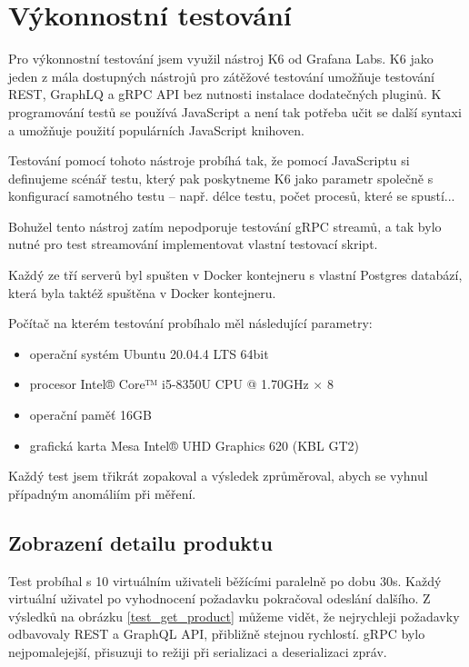 \documentclass[thesis=M,czech]{FITthesis}[2019/12/23]
\begin{document}
\chapter{Výkonnostní testování}
Pro výkonnostní testování jsem využil nástroj K6 od Grafana Labs. K6 jako jeden z mála dostupných nástrojů pro zátěžové testování umožňuje testování REST, GraphLQ a gRPC API bez nutnosti instalace dodatečných pluginů. K programování testů se používá JavaScript a není tak potřeba učit se další syntaxi a umožňuje použití populárních JavaScript knihoven.

Testování pomocí tohoto nástroje probíhá tak, že pomocí JavaScriptu si definujeme scénář testu, který pak poskytneme K6 jako parametr společně s konfigurací samotného testu -- např. délce testu, počet procesů, které se spustí...

Bohužel tento nástroj zatím nepodporuje testování gRPC streamů, a tak bylo nutné pro test streamování implementovat vlastní testovací skript.

Každý ze tří serverů byl spušten v Docker kontejneru s vlastní Postgres databází, která byla taktéž spuštěna v Docker kontejneru.

Počítač na kterém testování probíhalo měl následující parametry:

\begin{itemize}
  \item operační systém Ubuntu 20.04.4 LTS 64bit
  \item procesor Intel® Core™ i5-8350U CPU @ 1.70GHz $\times$  8 
  \item operační paměť 16GB
  \item grafická karta Mesa Intel® UHD Graphics 620 (KBL GT2)
\end{itemize}

Každý test jsem třikrát zopakoval a výsledek zprůměroval, abych se vyhnul případným anomáliím při měření.

\section{Zobrazení detailu produktu}
Test probíhal s 10 virtuálním uživateli běžícími paralelně po dobu 30s. Každý virtuální uživatel po vyhodnocení požadavku pokračoval odeslání dalšího. Z výsledků na obrázku \ref{test_get_product} můžeme vidět, že nejrychleji požadavky odbavovaly REST a GraphQL API, přibližně stejnou rychlostí. gRPC bylo nejpomalejejší, přisuzuji to režiji při serializaci a deserializaci zpráv.
\end{document}
